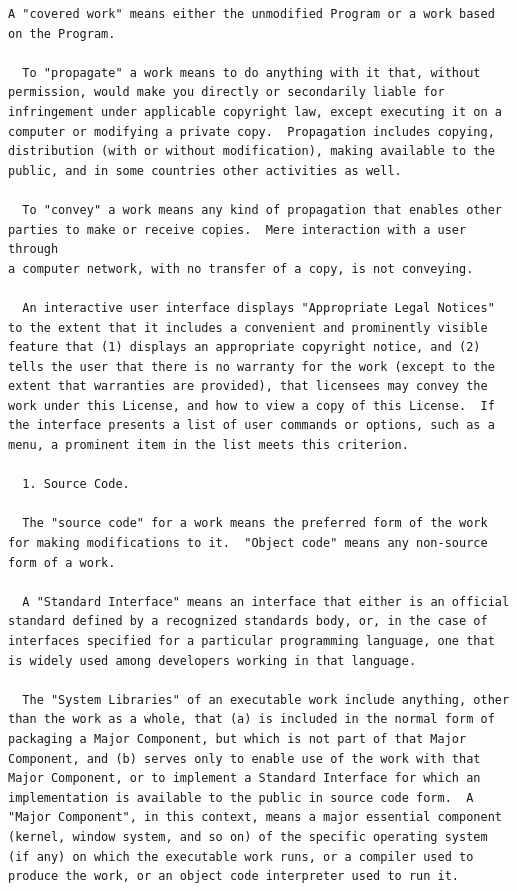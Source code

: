 \documentclass[letterpaper,10pt,english]{sphinxmanual}
\begin{document}
\begin{Verbatim}[commandchars=\\\{\}]
  A "covered work" means either the unmodified Program or a work based
on the Program.

  To "propagate" a work means to do anything with it that, without
permission, would make you directly or secondarily liable for
infringement under applicable copyright law, except executing it on a
computer or modifying a private copy.  Propagation includes copying,
distribution (with or without modification), making available to the
public, and in some countries other activities as well.

  To "convey" a work means any kind of propagation that enables other
parties to make or receive copies.  Mere interaction with a user through
a computer network, with no transfer of a copy, is not conveying.

  An interactive user interface displays "Appropriate Legal Notices"
to the extent that it includes a convenient and prominently visible
feature that (1) displays an appropriate copyright notice, and (2)
tells the user that there is no warranty for the work (except to the
extent that warranties are provided), that licensees may convey the
work under this License, and how to view a copy of this License.  If
the interface presents a list of user commands or options, such as a
menu, a prominent item in the list meets this criterion.

  1. Source Code.

  The "source code" for a work means the preferred form of the work
for making modifications to it.  "Object code" means any non-source
form of a work.

  A "Standard Interface" means an interface that either is an official
standard defined by a recognized standards body, or, in the case of
interfaces specified for a particular programming language, one that
is widely used among developers working in that language.

  The "System Libraries" of an executable work include anything, other
than the work as a whole, that (a) is included in the normal form of
packaging a Major Component, but which is not part of that Major
Component, and (b) serves only to enable use of the work with that
Major Component, or to implement a Standard Interface for which an
implementation is available to the public in source code form.  A
"Major Component", in this context, means a major essential component
(kernel, window system, and so on) of the specific operating system
(if any) on which the executable work runs, or a compiler used to
produce the work, or an object code interpreter used to run it.


\end{Verbatim}
\end{document}
